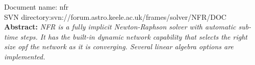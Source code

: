 \renewcommand{\ndoctitle}{NFR: Fully implicit Newton-Raphson solver} 
\renewcommand{\ndocname}{nfr}                      
\renewcommand{\svndir}{svn://forum.astro.keele.ac.uk/frames/solver/NFR/DOC}  
\renewcommand{\ndoccontribs}{FH}



Document name: \ndocname \\
SVN directory:\svndir\\

{ \textbf{Abstract:} \slshape NFR is a fully implicit Newton-Raphson
  solver with automatic sub-time steps. It has the built-in dynamic
  network capability that selects the right size opf the network as it
  is converging. Several linear algebra options are implemented.}





